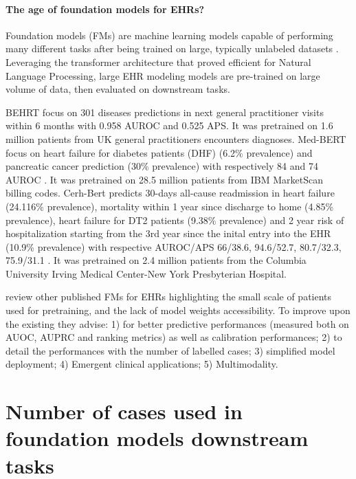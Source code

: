 \documentclass[french,12pt,twoside,a4paper]{book}
\begin{document}
\begin{appendices}
  \paragraph{The age of foundation models for EHRs?}

  Foundation models (FMs) are machine learning models capable of performing many
  different tasks after being trained on large, typically unlabeled datasets
  \citep{wornow2023shaky}. Leveraging the transformer architecture \cite{vaswani2017attention} that proved
  efficient for Natural Language Processing, large EHR modeling models are
  pre-trained on large volume of data, then evaluated on downstream tasks.%

  \textcolor{M}{BEHRT} focus on \textcolor{O}{301 diseases predictions in next general
    practitioner visits within 6 months} with \textcolor{S}{0.958 AUROC and 0.525
    APS}. It was pretrained on 1.6 million patients from UK general practitioners
  encounters diagnoses. %
  \textcolor{M}{Med-BERT} focus on \textcolor{O}{heart failure for diabetes patients
    (DHF) (6.2\% prevalence) and pancreatic cancer prediction (30\% prevalence)}
  with respectively \textcolor{S}{84 and 74 AUROC } \citep{rasmy2021med}. It was
  pretrained on 28.5 million patients from IBM MarketScan billing codes. %
  \textcolor{M}{Cerh-Bert} predicts \textcolor{O}{30-days all-cause readmission in
    heart failure (24.116\% prevalence), mortality within 1 year since discharge
    to home (4.85\% prevalence), heart failure for DT2 patients (9.38\%
    prevalence) and 2 year risk of hospitalization starting from the 3rd year
    since the inital entry into the EHR (10.9\% prevalence)} with respective
  AUROC/APS \textcolor{S}{66/38.6, 94.6/52.7, 80.7/32.3, 75.9/31.1}
  \citep{pang2021cehr}. It was pretrained on 2.4 million patients from the
  Columbia University Irving Medical Center-New York Presbyterian Hospital.%

  \cite{wornow2023shaky} review other published FMs for EHRs highlighting the
  small scale of patients used for pretraining, and the lack of model weights
  accessibility. To improve upon the existing they advise: 1) for better
  predictive performances (measured both on AUOC, AUPRC and ranking metrics) as
  well as calibration performances; 2) to detail the performances with the number
  of labelled cases; 3) simplified model deployment; 4) Emergent clinical
  applications; 5) Multimodality.

  \section{Number of cases used in foundation models downstream tasks}%
  \label{apd:foundation_model_nb_cases}


\end{appendices}
\end{document}
